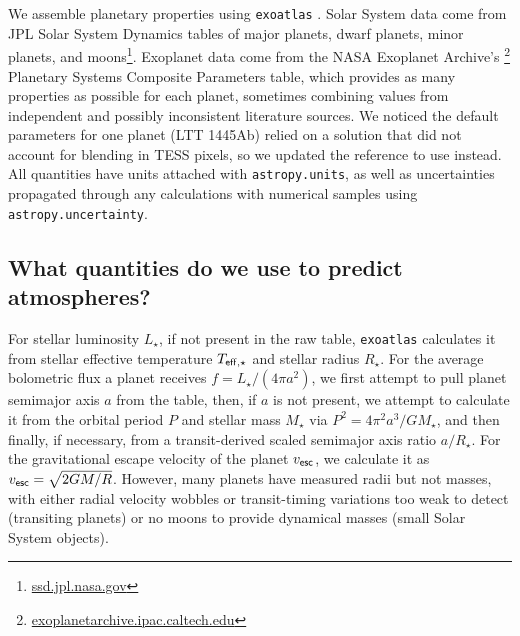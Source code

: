 \documentclass[modern,linenumbers,trackchanges]{aastex7}
\begin{document}
We assemble planetary properties using \texttt{exoatlas} \citep{berta-thompsonZkbtExoatlas2025}. Solar System data come from JPL Solar System Dynamics tables of major planets, dwarf planets, minor planets, and moons\footnote{\href{https://ssd.jpl.nasa.gov}{ssd.jpl.nasa.gov}}. Exoplanet data come from the NASA Exoplanet Archive's \citep{christiansenNASAExoplanetArchive2025}\footnote{\href{https://exoplanetarchive.ipac.caltech.edu}{exoplanetarchive.ipac.caltech.edu}} Planetary Systems Composite Parameters table, which provides as many properties as possible for each planet, sometimes combining values from independent and possibly inconsistent literature sources. We noticed the default parameters for one planet (LTT 1445Ab) relied on a solution that did not account for blending in TESS pixels, so we updated the reference to use  \citet{passHSTWFC3Light2023} instead. All quantities have units attached with \texttt{astropy.units}, as well as uncertainties propagated through any calculations with numerical samples using \texttt{astropy.uncertainty}. %


\subsection{What quantities do we use to predict atmospheres?}

For stellar luminosity $L_\star$, if not present in the raw table, \texttt{exoatlas} calculates it from stellar effective temperature $T_{\sf eff, \star}$ and stellar radius $R_\star$. For the average bolometric flux a planet receives $f = L_\star/(4\pi a^2)$, we first attempt to pull planet semimajor axis $a$ from the table, then, if $a$ is not present, we attempt to calculate it from the orbital period $P$ and stellar mass $M_\star$ via $P^2 = 4\pi^2 a^3/GM_\star$, and then finally, if necessary, from a transit-derived scaled semimajor axis ratio $a/R_\star$. For the gravitational escape velocity of the planet $v_{\sf esc}$, we calculate it as $v_{\sf esc} = \sqrt{2GM / R}$. However, many planets have measured radii but not masses, with either radial velocity wobbles or transit-timing variations too weak to detect (transiting planets) or no moons to provide dynamical masses (small Solar System objects). 
\end{document}
